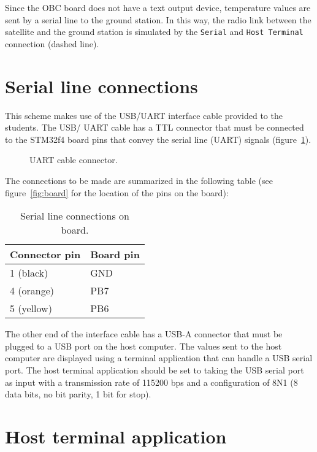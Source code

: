 Since the OBC board does not have a text output device,
temperature values are sent by a serial line to the ground station.
In this way, the radio link between
the satellite and the ground station is
simulated by the \texttt{Serial} and \texttt{Host Terminal} connection (dashed line).

\section{Serial line connections}

This scheme makes use of the USB/UART interface cable provided to the students. The USB/ UART cable has a TTL connector that must be connected to the STM32f4 board pins that convey the serial line (UART) signals (figure~\ref{fig:cable}).

\begin{figure}[h]
    \caption{UART cable connector.}
    \label{fig:cable}
\end{figure}

The connections to be made are summarized in the following table (see figure~\ref{fig:board} for the location of the pins on the board):

\begin{table}[htb]
\begin{center}
\begin{tabular}{ll} \hline
Connector pin & Board pin \\ \hline
1 (black) & GND \\
4 (orange) & PB7 \\
5 (yellow) & PB6 \\ \hline
\end{tabular}
\caption{Serial line connections on board.}
\label{tb:connections}
\end{center}
\end{table}

The other end of the interface cable has a USB-A connector
that must be plugged to a USB port on the host computer.
The values sent to the host computer are displayed using a terminal application
that can handle a USB serial port.
The host terminal application should be set to taking the USB serial port as input with
a transmission rate of 115200 bps and
a configuration of 8N1 (8 data bits, no bit parity, 1 bit for stop).

\section{Host terminal application}\label{sc:term}
